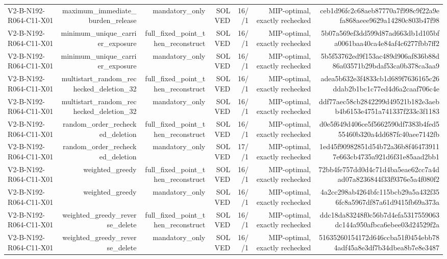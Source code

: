 {\begin{longtable}{lrrrrrr}
V2-B-N192-R064-C11-X01 & maximum\_immediate\_burden\_release & mandatory\_only & SOLVED & 16//1 & MIP-optimal, exactly rechecked & ceb1d96fc2c68aeb87770a7f998c9f22a9efa868aeee9629a14280c803b47f98 \\
V2-B-N192-R064-C11-X01 & minimum\_unique\_carrier\_exposure & full\_fixed\_point\_then\_reconstruct & SOLVED & 16//1 & MIP-optimal, exactly rechecked & 5b07a569ef3dd599d87ad663db1d105bfa0061baa40ca4e84af4c6277fbb7ff2 \\
V2-B-N192-R064-C11-X01 & minimum\_unique\_carrier\_exposure & mandatory\_only & SOLVED & 16//1 & MIP-optimal, exactly rechecked & 5b5f53762ed9f153ac489d906af836b88d86a03571b29bdaf53ca0b378ca3aa9 \\
V2-B-N192-R064-C11-X01 & multistart\_random\_rechecked\_deletion\_32 & full\_fixed\_point\_then\_reconstruct & SOLVED & 16//1 & MIP-optimal, exactly rechecked & adea5b632e3f4833cb1d689f7636165c26ddab2b1bc1c77ed4d6a2caaf706c4e \\
V2-B-N192-R064-C11-X01 & multistart\_random\_rechecked\_deletion\_32 & mandatory\_only & SOLVED & 16//1 & MIP-optimal, exactly rechecked & ddf77aec58cb2842299d49521b182e3aebb4b6153e4751a741337f233c3f1183 \\
V2-B-N192-R064-C11-X01 & random\_order\_rechecked\_deletion & full\_fixed\_point\_then\_reconstruct & SOLVED & 16//1 & MIP-optimal, exactly rechecked & d0e5f649d406ce5f5662590df7383b4fed555460b320a4dd687fc40aee7142fb \\
V2-B-N192-R064-C11-X01 & random\_order\_rechecked\_deletion & mandatory\_only & SOLVED & 17//1 & MIP-optimal, exactly rechecked & 1ed45f90982851d54b72a36b8f464739117e663cb4735a921d6f31e85aad2bb1 \\
V2-B-N192-R064-C11-X01 & weighted\_greedy & full\_fixed\_point\_then\_reconstruct & SOLVED & 16//1 & MIP-optimal, exactly rechecked & 72bb4fe757dd0d4c71d4ba5eae62cc7a4dad07a8236844f33f9376e5a4f080f2 \\
V2-B-N192-R064-C11-X01 & weighted\_greedy & mandatory\_only & SOLVED & 16//1 & MIP-optimal, exactly rechecked & 4a2cc298ab4264bfc115bcb29a5a432f356fc8a5967df87a61d9415fb69a373a \\
V2-B-N192-R064-C11-X01 & weighted\_greedy\_reverse\_delete & full\_fixed\_point\_then\_reconstruct & SOLVED & 16//1 & MIP-optimal, exactly rechecked & ddc18da83248f0c56b7d4efa5317559063dc144a950afbca6ebee03d24529f2a \\
V2-B-N192-R064-C11-X01 & weighted\_greedy\_reverse\_delete & mandatory\_only & SOLVED & 16//1 & MIP-optimal, exactly rechecked & 51635260154172d646ccba51f0454ebb784adf45a8e3df7b34dbea8b7e8e3487 \\

\end{longtable}}
